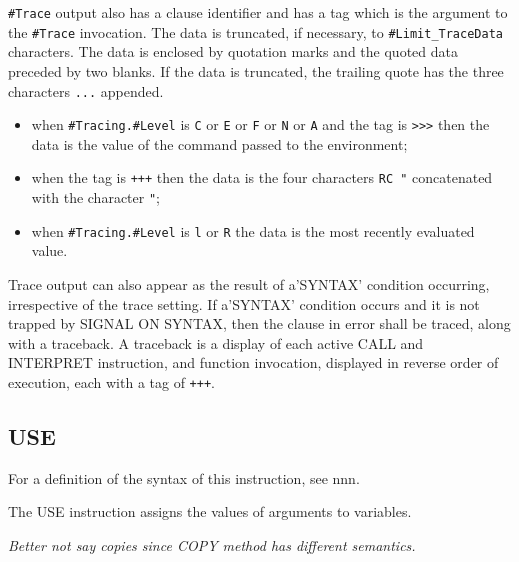 \texttt{\#Trace} output also has a clause identifier and has a tag which
is the argument to the \texttt{\#Trace} invocation. The data is
truncated, if necessary, to \texttt{\#Limit\_TraceData} characters. The
data is enclosed by quotation marks and the quoted data preceded by two
blanks. If the data is truncated, the trailing quote has the three
characters \texttt{\textquotesingle{}...\textquotesingle{}} appended.

\begin{itemize}
\tightlist
\item
  when \texttt{\#Tracing.\#Level} is
  \texttt{\textquotesingle{}C\textquotesingle{}} or
  \texttt{\textquotesingle{}E\textquotesingle{}} or
  \texttt{\textquotesingle{}F\textquotesingle{}} or
  \texttt{\textquotesingle{}N\textquotesingle{}} or
  \texttt{\textquotesingle{}A\textquotesingle{}} and the tag is
  \texttt{\textquotesingle{}\textgreater{}\textgreater{}\textgreater{}\textquotesingle{}}
  then the data is the value of the command passed to the environment;
\item
  when the tag is \texttt{\textquotesingle{}+++\textquotesingle{}} then
  the data is the four characters
  \texttt{\textquotesingle{}RC\ "\textquotesingle{}} concatenated with
  the character \texttt{\textquotesingle{}"\textquotesingle{}};
\item
  when \texttt{\#Tracing.\#Level} is
  \texttt{\textquotesingle{}l\textquotesingle{}} or
  \texttt{\textquotesingle{}R\textquotesingle{}} the data is the most
  recently evaluated value.
\end{itemize}

Trace output can also appear as the result of a'SYNTAX' condition
occurring, irrespective of the trace setting. If a'SYNTAX' condition
occurs and it is not trapped by SIGNAL ON SYNTAX, then the clause in
error shall be traced, along with a traceback. A traceback is a display
of each active CALL and INTERPRET instruction, and function invocation,
displayed in reverse order of execution, each with a tag of
\texttt{\textquotesingle{}+++\textquotesingle{}}.

\subsection{USE}\label{use}

For a definition of the syntax of this instruction, see nnn.

The USE instruction assigns the values of arguments to variables.

\emph{Better not say copies since COPY method has different semantics.}

